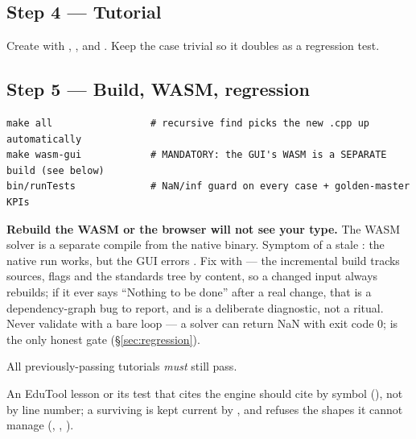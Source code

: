 \documentclass[11pt,a4paper]{article}
\begin{document}
\subsection{Step 4 --- Tutorial}

Create  with
, , and
. Keep the case trivial so it doubles as a
regression test.

\subsection{Step 5 --- Build, WASM, regression}

\begin{lstlisting}
make all                 # recursive find picks the new .cpp up automatically
make wasm-gui            # MANDATORY: the GUI's WASM is a SEPARATE build (see below)
bin/runTests             # NaN/inf guard on every case + golden-master KPIs
\end{lstlisting}

\begin{pitfall}
\textbf{Rebuild the WASM or the browser will not see your type.}  The WASM
solver is a separate compile from the native binary.  Symptom of a stale
: the native run works, but the GUI errors
.  Fix with 
--- the incremental build tracks sources, flags and the standards tree by
content, so a changed input always rebuilds; if it ever says ``Nothing to be
done'' after a real change, that is a dependency-graph bug to report, and
 is a deliberate diagnostic, not a ritual.  Never validate with a bare
 loop --- a solver can return NaN with
exit code 0;  is the only honest gate (\S\ref{sec:regression}).
\end{pitfall}

All previously-passing tutorials \emph{must} still pass.

An EduTool lesson or its test that cites the engine should cite by symbol
(), not by line number; a surviving
 is kept current by ,
and  refuses the shapes it
cannot manage (, , ).

\end{document}
